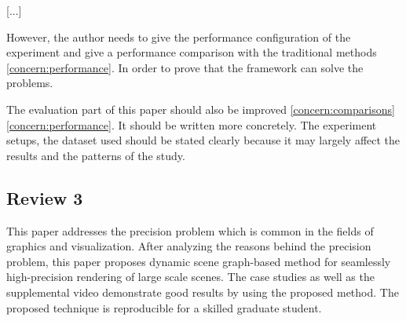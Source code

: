 \documentclass{article}
\begin{document}
[...]

However, the author needs to give the performance configuration of the experiment and give a performance comparison with the traditional methods \eqref{concern:performance}. 
In order to prove that the framework can solve the problems.
    
The evaluation part of this paper should also be improved \eqref{concern:comparisons} \eqref{concern:performance}.
It should be written more concretely.
The experiment setups, the dataset used should be stated clearly because it may largely affect the results and the patterns of the study.

\subsection*{Review 3}

This paper addresses the precision problem which is common in the fields of graphics and visualization.
After analyzing the reasons behind the precision problem, this paper proposes dynamic scene graph-based method for seamlessly high-precision rendering of large scale scenes.
The case studies as well as the supplemental video demonstrate good results by using the proposed method.
The proposed technique is reproducible for a skilled graduate student.
\end{document}
